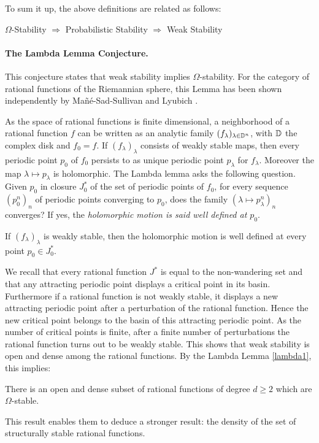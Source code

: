 \documentclass[11pt,openany,leqno]{article}
\begin{document}
To sum it up, the above definitions are related as follows:
\begin{center}
$\Omega$-Stability ${\Rightarrow}$
Probabilistic  Stability $\Rightarrow $ Weak Stability
\end{center}

\paragraph{The Lambda Lemma Conjecture.} This conjecture states that weak stability implies $\Omega$-stability. For the category of rational functions of the Riemannian sphere, this Lemma has been shown independently by Ma\~n\'e-Sad-Sullivan \cite{MSS} and Lyubich  \cite{Ly84}. 

As the space of rational functions is finite dimensional, a neighborhood of a rational function $f$ can be written as an analytic family $(f_\lambda)_{\lambda\in \mathbb D^n}$, with $\mathbb D$ the complex disk and $f_0=f$. If $(f_\lambda)_\lambda$ consists of weakly stable maps, then every periodic point $p_0$ of $f_0$ persists to as unique periodic point $p_\lambda$ for $f_\lambda$. Moreover the map $\lambda\mapsto p_\lambda$ is holomorphic. The Lambda lemma asks the following question. Given $p_0$ in closure $J^*_0$ of the set of periodic points of $f_0$, for every  sequence $(p^n_0)_n$ of periodic points converging to $p_0$, does the family $(\lambda \mapsto p^n_\lambda)_n$ converges? If yes, the\emph{ holomorphic motion is said well defined at $p_0$}.
\begin{lemm}\label{lambda1}
If $(f_\lambda)_\lambda$ is weakly stable, then the holomorphic motion is well defined at every point $p_0\in J^*_0$.
\end{lemm}




We recall that every rational function $J^*$ is equal to the non-wandering set and that any attracting  periodic point displays a critical point in its basin. Furthermore if a rational function is not weakly stable, it displays a new attracting periodic point after a perturbation of the rational function. Hence the new critical point belongs to the basin of this attracting periodic point.  As the number of critical points is finite, after a finite number of perturbations the rational function turns out to be  weakly stable. This shows that weak stability is open and dense among the rational functions. By the Lambda Lemma \ref{lambda1}, this implies:
\begin{thm}
There is an open and dense subset of rational functions of degree $d\ge2$ which are  $\Omega$-stable.
\end{thm}
This result enables them to deduce a stronger result: the density of the set of structurally stable rational functions.
\end{document}
